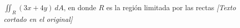 \item $\iint_R (3x + 4y) \, dA$, en donde $R$ es la región limitada por las rectas \textit{[Texto cortado en el original]}
